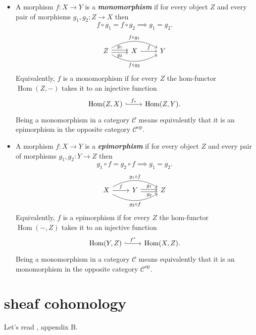 \documentclass{article}
\newcommand{\Cc}{\mathcal{C}}
\DeclareMathOperator{\Hom}{Hom}
\DeclareMathOperator{\op}{op}
\begin{document}
\begin{defn}
\begin{itemize}
		\item A morphism $f:X\to Y$ is a \textbf{\textit{monomorphism}} if for every object $Z$ and every pair of morphisms $g_1,g_2:Z\to X$ then
		\[f\circ g_1=f\circ g_2\implies g_1=g_2.\]
		\[\begin{tikzcd}
			Z\arrow[r,shift={(0,.06)},"g_1"]\arrow[r,swap,shift={(0,-.06)},"g_2"]\arrow[rr,bend left,"f\circ g_1"]\arrow[rr,bend right,swap,"f\circ g_2"]&X\arrow[r,"f"]&Y
		\end{tikzcd}\]
		Equivalently, $f$ is a monomorphism if for every $Z$ the hom-functor $\Hom(Z,-)$ takes it to an injective function
		\[\begin{tikzcd}
			\Hom(Z,X)\arrow[r,hook,"f_*"]&\Hom(Z,Y).
		\end{tikzcd}\]
		Being a monomorphism in a category $\Cc$ means equivalently that it is an epimorphism in the opposite category $\Cc^{\op}$.
		
		\item A morphism $f:X\to Y$ is a \textbf{\textit{epimorphism}} if for every object $Z$ and every pair of morphisms $g_1,g_2:Y\to Z$ then
		\[g_1\circ f=g_2\circ f\implies g_1=g_2.\]
		\[\begin{tikzcd}
			X\arrow[r,"f"]\arrow[rr,bend right,swap,"g_2\circ f"]\arrow[rr,bend left,"g_1\circ f"]&Y\arrow[r,shift={(0,.06)},"g_1"]\arrow[r,swap,shift={(0,-.06)},"g_2"]&Z
		\end{tikzcd}\]
		Equivalently, $f$ is a epimorphism if for every $Z$ the hom-functor $\Hom(-,Z)$ takes it to an injective function
		\[\begin{tikzcd}
			\Hom(Y,Z)\arrow[r,hook,"f^*"]&\Hom(X,Z).
		\end{tikzcd}\]
		Being a monomorphism in a category $\Cc$ means equivalently that it is an monomorphism in the opposite category $\Cc^{\op}$.
	\end{itemize}
\end{defn}
\section{sheaf cohomology}
Let's read \cite{huybrechts}, appendix B.
\end{document}
